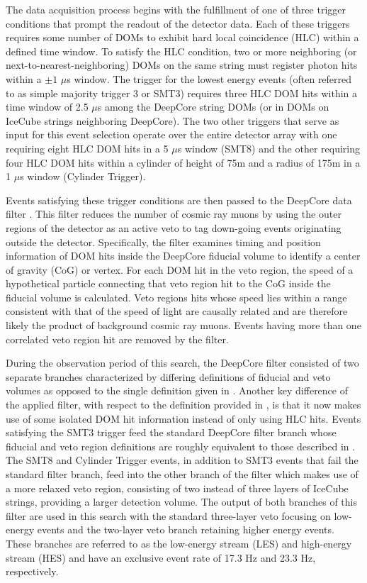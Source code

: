 \documentclass[manuscript]{aastex}
\begin{document}
The data acquisition process begins with the fulfillment of one of three trigger conditions that prompt the readout of the detector data. Each of these triggers requires some number of DOMs to exhibit hard local coincidence (HLC) within a defined time window. To satisfy the HLC condition, two or more neighboring (or next-to-nearest-neighboring) DOMs on the same string must register photon hits within a $\pm1$ $\mu$s window. The trigger for the lowest energy events (often referred to as simple majority trigger 3 or SMT3) requires three HLC DOM hits within a time window of 2.5 $\mu$s among the DeepCore string DOMs (or in DOMs on IceCube strings neighboring DeepCore). The two other triggers that serve as input for this event selection operate over the entire detector array with one requiring eight HLC DOM hits in a 5 $\mu$s window (SMT8) and the other requiring four HLC DOM hits within a cylinder of height of 75m and a radius of 175m in a 1 $\mu$s window (Cylinder Trigger).

Events satisfying these trigger conditions are then passed to the DeepCore data filter \citep{2012APh....35..615A}. This filter reduces the number of cosmic ray muons by using the outer regions of the detector as an active veto to tag down-going events originating outside the detector. Specifically, the filter examines timing and position information of DOM hits inside the DeepCore fiducial volume to identify a center of gravity (CoG) or vertex. For each DOM hit in the veto region, the speed of a hypothetical particle connecting that veto region hit to the CoG inside the fiducial volume is calculated. Veto regions hits whose speed lies within a range consistent with that of the speed of light are causally related and are therefore likely the product of background cosmic ray muons. Events having more than one correlated veto region hit are removed by the filter.

During the observation period of this search, the DeepCore filter consisted of two separate branches characterized by differing definitions of fiducial and veto volumes as opposed to the single definition given in \cite{2012APh....35..615A}. Another key difference of the applied filter, with respect to the definition provided in \cite{2012APh....35..615A}, is that it now makes use of some isolated DOM hit information instead of only using HLC hits. Events satisfying the SMT3 trigger feed the standard DeepCore filter branch whose fiducial and veto region definitions are roughly equivalent to those described in \cite{2012APh....35..615A}. The SMT8 and Cylinder Trigger events, in addition to SMT3 events that fail the standard filter branch, feed into the other branch of the filter which makes use of a more relaxed veto region, consisting of two instead of three layers of IceCube strings, providing a larger detection volume. The output of both branches of this filter are used in this search with the standard three-layer veto focusing on low-energy events and the two-layer veto branch retaining higher energy events. These branches are referred to as the low-energy stream (LES) and high-energy stream (HES) and have an exclusive event rate of 17.3 Hz and 23.3 Hz, respectively.
\end{document}
